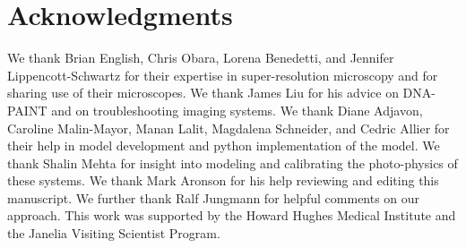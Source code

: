 \section{Acknowledgments}
We thank Brian English, Chris Obara, Lorena Benedetti, and Jennifer Lippencott-Schwartz for their expertise in
    super-resolution microscopy and for sharing use of their microscopes. 
    We thank James Liu for his advice on DNA-PAINT and on troubleshooting imaging systems.
    We thank Diane Adjavon, Caroline Malin-Mayor, Manan Lalit, Magdalena Schneider, and Cedric Allier 
    for their help in model development and python implementation of the model. 
    We thank Shalin Mehta for insight into modeling and calibrating the photo-physics of these systems.
    We thank Mark Aronson for his help reviewing and editing this manuscript. 
    We further thank Ralf Jungmann for helpful comments on our approach.
    This work was supported by the Howard Hughes Medical Institute and the Janelia Visiting Scientist Program.
